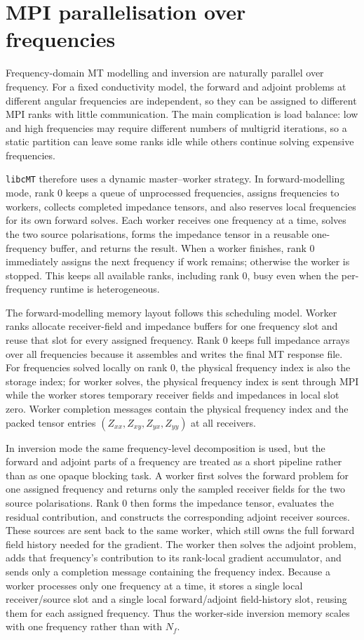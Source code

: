 \documentclass{article}
\begin{document}
\section{MPI parallelisation over frequencies}

Frequency-domain MT modelling and inversion are naturally parallel over frequency. For a fixed conductivity model, the forward and adjoint problems at different angular frequencies are independent, so they can be assigned to different MPI ranks with little communication. The main complication is load balance: low and high frequencies may require different numbers of multigrid iterations, so a static partition can leave some ranks idle while others continue solving expensive frequencies.

\texttt{libcMT} therefore uses a dynamic master--worker strategy. In forward-modelling mode, rank 0 keeps a queue of unprocessed frequencies, assigns frequencies to workers, collects completed impedance tensors, and also reserves local frequencies for its own forward solves. Each worker receives one frequency at a time, solves the two source polarisations, forms the impedance tensor in a reusable one-frequency buffer, and returns the result. When a worker finishes, rank 0 immediately assigns the next frequency if work remains; otherwise the worker is stopped. This keeps all available ranks, including rank 0, busy even when the per-frequency runtime is heterogeneous.

The forward-modelling memory layout follows this scheduling model. Worker ranks allocate receiver-field and impedance buffers for one frequency slot and reuse that slot for every assigned frequency. Rank 0 keeps full impedance arrays over all frequencies because it assembles and writes the final MT response file. For frequencies solved locally on rank 0, the physical frequency index is also the storage index; for worker solves, the physical frequency index is sent through MPI while the worker stores temporary receiver fields and impedances in local slot zero. Worker completion messages contain the physical frequency index and the packed tensor entries $(Z_{xx},Z_{xy},Z_{yx},Z_{yy})$ at all receivers.

In inversion mode the same frequency-level decomposition is used, but the forward and adjoint parts of a frequency are treated as a short pipeline rather than as one opaque blocking task. A worker first solves the forward problem for one assigned frequency and returns only the sampled receiver fields for the two source polarisations. Rank 0 then forms the impedance tensor, evaluates the residual contribution, and constructs the corresponding adjoint receiver sources. These sources are sent back to the same worker, which still owns the full forward field history needed for the gradient. The worker then solves the adjoint problem, adds that frequency's contribution to its rank-local gradient accumulator, and sends only a completion message containing the frequency index. Because a worker processes only one frequency at a time, it stores a single local receiver/source slot and a single local forward/adjoint field-history slot, reusing them for each assigned frequency. Thus the worker-side inversion memory scales with one frequency rather than with $N_f$.
\end{document}
